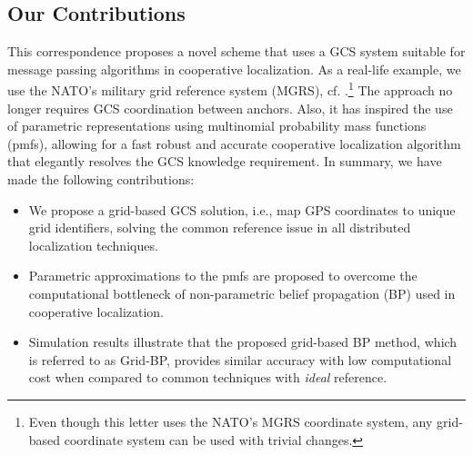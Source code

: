 \documentclass[10pt, final, journal]{IEEEtran}
\begin{document}
\subsection{Our Contributions}
This correspondence proposes a novel scheme that uses a GCS system suitable for message passing algorithms in cooperative localization. As a real-life example, we use the NATO's military grid reference system (MGRS), cf. \cite{ngamgrs}.\footnote{Even though this letter uses the NATO's MGRS coordinate system, any grid-based coordinate system can be used with trivial changes.} The approach no longer requires GCS coordination between anchors. Also, it has inspired the use of parametric representations using multinomial probability mass functions (pmfs), allowing for a fast robust and accurate cooperative localization algorithm that elegantly resolves the GCS knowledge requirement. In summary, we have made the following contributions:
\begin{itemize}
\item We propose a grid-based GCS solution, i.e., map GPS coordinates to unique grid identifiers, solving the common reference issue in all distributed localization techniques.
\item Parametric approximations to the pmfs are proposed to overcome the computational bottleneck of non-parametric belief propagation (BP) used in cooperative localization.
\item Simulation results illustrate that the proposed grid-based BP method, which is referred to as Grid-BP, provides similar accuracy with low computational cost when compared to common techniques with {\em ideal} reference.
\end{itemize}
\end{document}
